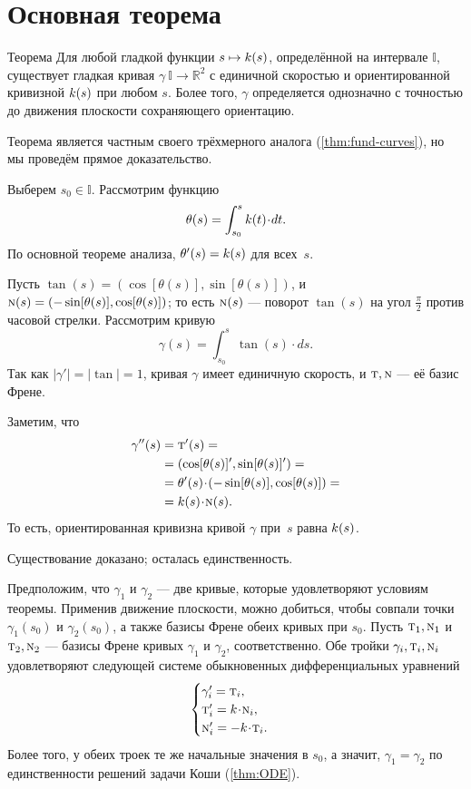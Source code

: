 \section{Основная теорема}

\begin{thm}{Теорема}\label{thm:fund-curves-2D}
Для любой гладкой функции $s\mapsto k(s)$, определённой на интервале $\mathbb{I}$,
существует гладкая кривая $\gamma\:\mathbb{I}\to\mathbb{R}^2$ с единичной скоростью и ориентированной кривизной $k(s)$ при любом $s$.
Более того, $\gamma$ определяется однозначно с точностью до движения плоскости сохраняющего ориентацию.
\end{thm}

Теорема является частным своего трёхмерного аналога (\ref{thm:fund-curves}), но мы проведём прямое доказательство.


Выберем $s_0\in\mathbb{I}$.
Рассмотрим функцию
\[\theta(s)
=
\int_{s_0}^s\skur(t)\cdot dt.\]
По основной теореме анализа, $\theta'(s)\z=\skur(s)$ для всех~$s$.

Пусть 
$\tan(s)=(\cos[\theta(s)],\sin[\theta(s)])$,
и $\text{\sc{n}}(s)=(-\sin[\theta(s)],\cos[\theta(s)])$;
то есть $\text{\sc{n}}(s)$ --- поворот $\tan(s)$ на угол $\tfrac\pi2$ против часовой стрелки.
Рассмотрим кривую 
\[\gamma(s)=\int_{s_0}^s\tan(s)\cdot ds.\]
Так как $|\gamma'|=|\tan|=1$, кривая $\gamma$ имеет единичную скорость, и $\text{\sc{t}},\text{\sc{n}}$ --- её базис Френе. 

Заметим, что
\begin{align*}
\gamma''(s)&=\tan'(s)=
\\
&=(\cos[\theta(s)]',\sin[\theta(s)]')=
\\
&=\theta'(s)\cdot (-\sin[\theta(s)],\cos[\theta(s)])=
\\
&=\skur(s)\cdot \norm(s).
\end{align*}
То есть, ориентированная кривизна кривой $\gamma$ при~$s$ равна $k(s)$. 

Существование доказано; осталась единственность.

Предположим, что $\gamma_1$ и $\gamma_2$ --- две кривые, которые удовлетворяют условиям теоремы.
Применив движение плоскости, можно добиться, чтобы совпали точки $\gamma_1(s_0)$ и $\gamma_2(s_0)$, а также базисы Френе обеих кривых при $s_0$.
Пусть $\text{\sc{t}}_1,\text{\sc{n}}_1$ и $\text{\sc{t}}_2,\text{\sc{n}}_2$ --- базисы Френе кривых $\gamma_1$ и $\gamma_2$, соответственно.
Обе тройки $\gamma_i,\text{\sc{t}}_i,\text{\sc{n}}_i$ удовлетворяют следующей системе обыкновенных дифференциальных уравнений 
\[
\begin{cases}
\gamma_i'=\tan_i,
\\
\tan_i'=\skur\cdot\norm_i,
\\
\norm_i'=-\skur\cdot\tan_i.
\end{cases}
\]
Более того, у обеих троек те же начальные значения в $s_0$,
а значит, $\gamma_1=\gamma_2$ по единственности решений задачи Коши (\ref{thm:ODE}).
\qeds

